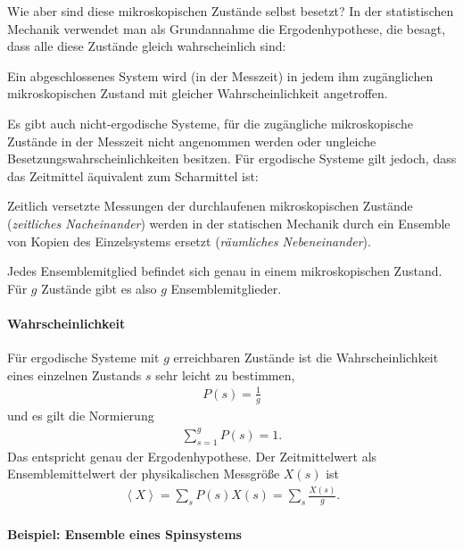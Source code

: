 Wie aber sind diese mikroskopischen Zustände selbst besetzt? In der statistischen Mechanik verwendet man als Grundannahme die Ergodenhypothese, die besagt, dass alle diese Zustände gleich wahrscheinlich sind:
\begin{postulate}[Ergodenhypothese]
    \label{post:Ergodenhypothese}
    Ein abgeschlossenes System wird (in der Messzeit) in jedem ihm zugänglichen mikroskopischen Zustand mit gleicher Wahrscheinlichkeit angetroffen.
\end{postulate}

Es gibt auch nicht-ergodische Systeme, für die zugängliche mikroskopische Zustände in der Messzeit nicht angenommen werden oder ungleiche Besetzungswahrscheinlichkeiten besitzen.
Für ergodische Systeme gilt jedoch, dass das Zeitmittel äquivalent zum Scharmittel ist:
\begin{formal}
    Zeitlich versetzte Messungen der durchlaufenen mikroskopischen Zustände (\emph{zeitliches Nacheinander}) werden in der statischen Mechanik durch ein Ensemble von Kopien des Einzelsystems ersetzt (\emph{räumliches Nebeneinander}).

    Jedes Ensemblemitglied befindet sich genau in einem mikroskopischen Zustand. Für $g$ Zustände gibt es also $g$ Ensemblemitglieder.
\end{formal}


\paragraph*{Wahrscheinlichkeit}

Für ergodische Systeme mit $g$ erreichbaren Zustände ist die Wahrscheinlichkeit eines einzelnen Zustands $s$ sehr leicht zu bestimmen,
\begin{align*}
    P(s) = \frac{1}{g}
\end{align*}
und es gilt die Normierung
\begin{align*}
    \sum_{s=1}^g P(s) = 1.
\end{align*}
Das entspricht genau der Ergodenhypothese.
Der Zeitmittelwert als Ensemblemittelwert der physikalischen Messgröße $X(s)$ ist
\begin{align*}
    \left\langle X\right\rangle = \sum_s P(s)X(s) = \sum_s \frac{X(s)}{g}.
\end{align*}

\paragraph*{Beispiel: Ensemble eines Spinsystems}

